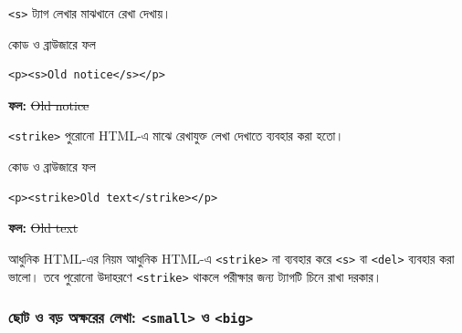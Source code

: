 \texttt{<s>} ট্যাগ লেখার মাঝখানে রেখা দেখায়।

\begin{chFourWholeExample}{কোড ও ব্রাউজারে ফল}
\noindent
\begin{minipage}[t]{.50\linewidth}\vspace{0pt}

\begin{verbatim}
<p><s>Old notice</s></p>
\end{verbatim}

\end{minipage}\hfill
\begin{minipage}[t]{.46\linewidth}\vspace{0pt}
\textbf{ফল:} \sout{Old notice}\\
\end{minipage}
\end{chFourWholeExample}

\texttt{<strike>} পুরোনো HTML-এ মাঝে রেখাযুক্ত লেখা দেখাতে ব্যবহার করা হতো।

\begin{chFourWholeExample}{কোড ও ব্রাউজারে ফল}
\noindent
\begin{minipage}[t]{.50\linewidth}\vspace{0pt}

\begin{verbatim}
<p><strike>Old text</strike></p>
\end{verbatim}

\end{minipage}\hfill
\begin{minipage}[t]{.46\linewidth}\vspace{0pt}
\textbf{ফল:} \sout{Old text}\\
\end{minipage}
\end{chFourWholeExample}

\begin{mistakebox}{আধুনিক HTML-এর নিয়ম}
আধুনিক HTML-এ \texttt{<strike>} না ব্যবহার করে \texttt{<s>} বা \texttt{<del>} ব্যবহার করা ভালো। তবে পুরোনো উদাহরণে \texttt{<strike>} থাকলে পরীক্ষার জন্য ট্যাগটি চিনে রাখা দরকার।
\end{mistakebox}

\subsubsection{ছোট ও বড় অক্ষরের লেখা: \texttt{<small>} ও \texttt{<big>}}

